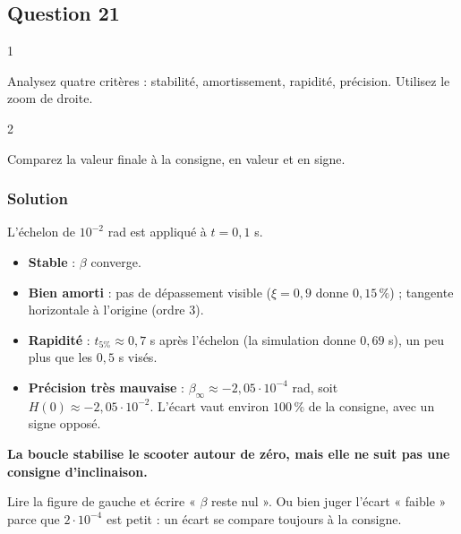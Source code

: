 \documentclass[11pt,a4paper]{article}
\providecommand{\tightlist}{\setlength{\itemsep}{0pt}\setlength{\parskip}{0pt}}
\begin{document}
\hypertarget{question-21}{%
\subsection{Question 21}\label{question-21}}

\begin{indication}{1}

Analysez quatre critères : stabilité, amortissement, rapidité, précision. Utilisez le zoom de droite.

\end{indication}

\begin{indication}{2}

Comparez la valeur finale à la consigne, en valeur et en signe.

\end{indication}

\hypertarget{solution-20}{%
\subsubsection{Solution}\label{solution-20}}

L'échelon de \(10^{-2}\) rad est appliqué à \(t=0{,}1\) s.

\begin{itemize}
\tightlist
\item
  \textbf{Stable} : \(\beta\) converge.
\item
  \textbf{Bien amorti} : pas de dépassement visible (\(\xi=0{,}9\) donne \(0{,}15\,\%\)) ; tangente horizontale à l'origine (ordre 3).
\item
  \textbf{Rapidité} : \(t_{5\%}\approx0{,}7\) s après l'échelon (la simulation donne \(0{,}69\) s), un peu plus que les \(0{,}5\) s visés.
\item
  \textbf{Précision très mauvaise} : \(\beta_\infty\approx-2{,}05\cdot10^{-4}\) rad, soit \(H(0)\approx-2{,}05\cdot10^{-2}\). L'écart vaut environ \(100\,\%\) de la consigne, avec un signe opposé.
\end{itemize}

\textbf{La boucle stabilise le scooter autour de zéro, mais elle ne suit pas une consigne d'inclinaison.}

\begin{piege}

Lire la figure de gauche et écrire « \(\beta\) reste nul ». Ou bien juger l'écart « faible » parce que \(2\cdot10^{-4}\) est petit : un écart se compare toujours à la consigne.

\end{piege}
\end{document}
